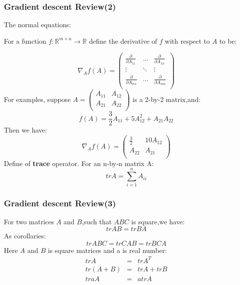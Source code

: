 \documentclass[slidestop,compress,mathserif]{beamer}
\begin{document}
    \begin{frame}
        \frametitle{Gradient descent Review(2)}
        \fontsize{8pt}{7.2}\selectfont
        The normal equations:

        For a function $f:\mathbb{R}^{m\times n}\to \mathbb{R}$ define the derivative of $f$ with respect to $A$ to be:

        $$\nabla_Af(A)=\left(
                         \begin{array}{ccc}
                           \frac{\partial}{\partial A_{11}} & \ldots & \frac{\partial}{\partial A_{1n}} \\
                           \vdots & \ddots & \vdots \\
                           \frac{\partial}{\partial A_{m1}} & \ldots & \frac{\partial}{\partial A_{mn}} \\
                         \end{array}
                       \right)
        $$
        For examples, suppose $A=\left(
                                   \begin{array}{cc}
                                     A_{11} & A_{12} \\
                                     A_{21} & A_{22} \\
                                   \end{array}
                                 \right)
        $ is a 2-by-2 matrix,and:
        $$f(A)= \frac{3}{2}A_{11}+5A_{12}^2+A_{21}A_{22}$$
        Then we have:
        $$\nabla_Af(A)=\left(
                         \begin{array}{cc}
                           \frac{3}{2} & 10A_{12} \\
                           A_{22} & A_{21} \\
                         \end{array}
                       \right)
        $$
        Define of \textbf{trace} operator. For an n-by-n matrix A:
        $$trA=\sum_{i=1}^n A_{ii}$$
    \end{frame}
    \begin{frame}
        \frametitle{Gradient descent Review(3)}
        For two matrices $A$ and $B$,such that $ABC$ is square,we have:
        $$trAB=trBA$$
        As corollaries:
        $$trABC=trCAB=trBCA$$
        Here $A$ and $B$ is square matrices and a is real number:
        \begin{eqnarray*}
            trA &=& trA^T\\
            tr(A+B)&=& trA+trB\\
            traA &=& atrA
        \end{eqnarray*}

    \end{frame}
\end{document}
